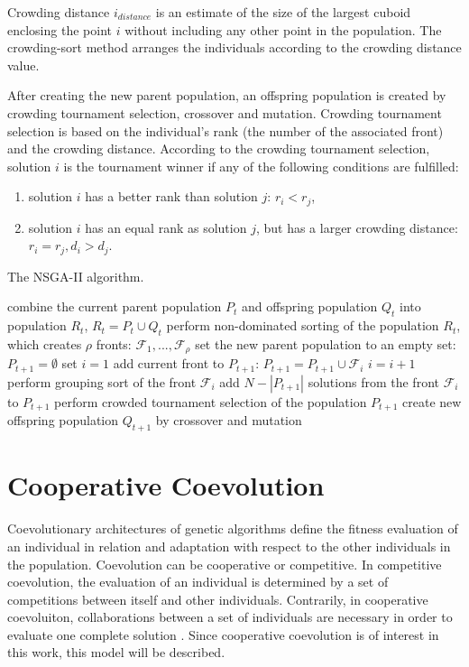 Crowding distance $i_{distance}$ is an estimate of the size of the largest cuboid enclosing the point $i$ without including any other point in the population. 
The crowding-sort method arranges the individuals according to the crowding distance value.

After creating the new parent population, an offspring population is created by crowding tournament selection, crossover and mutation. 
Crowding tournament selection is based on the individual's rank (the number of the associated front) and the crowding distance. 
According to the crowding tournament selection, solution $i$ is the tournament winner if any of the following conditions are fulfilled:
\begin{enumerate}
	\item solution $i$ has a better rank than solution $j$: $r_i < r_j$,
	\item solution $i$ has an equal rank as solution $j$, but has a larger crowding distance: $r_i=r_j, d_i > d_j$.
\end{enumerate}

\begin{algorithm}
\caption{The NSGA-II algorithm.\label{nsga-ii}}
\begin{algorithmic}
\STATE combine the current parent population $P_t$ and offspring population $Q_t$ into population $R_t$, $R_t = P_t \cup Q_t$
\STATE perform non-dominated sorting of the population $R_t$, which creates $\rho$ fronts: 
$\mathcal{F}_1, ..., \mathcal{F}_\rho$ 
\STATE set the new parent population to an empty set: $P_{t+1} = \emptyset$
\STATE set $i=1$
\STATE add current front to $P_{t+1}$: $P_{t+1} = P_{t+1} \cup \mathcal{F}_i$
\STATE $i=i+1$
\ENDWHILE
\STATE perform grouping sort of the front $\mathcal{F}_i$
\STATE add $N-|P_{t+1}|$ solutions from the front $\mathcal{F}_i$ to $P_{t+1}$
\STATE perform crowded tournament selection of the population $P_{t+1}$
\STATE create new offspring population $Q_{t+1}$ by crossover and mutation
\end{algorithmic}
\end{algorithm}

\section{Cooperative Coevolution}
Coevolutionary architectures of genetic algorithms define the fitness evaluation of an individual in relation and adaptation with respect to the other individuals in the population. 
Coevolution can be cooperative or competitive. 
In competitive coevolution, the evaluation of an individual is determined by a set of competitions between itself and other individuals. 
Contrarily, in cooperative coevoluiton, collaborations between a set of individuals are necessary in order to evaluate one complete solution \cite{stoean2014support}. 
Since cooperative coevolution is of interest in this work, this model will be described. 

